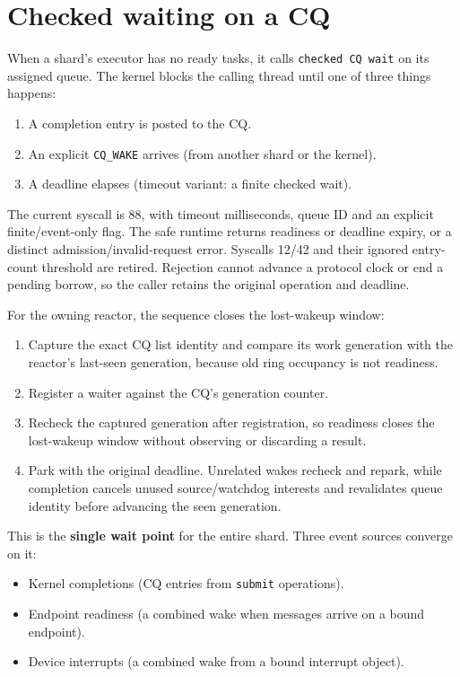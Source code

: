 \section{Checked waiting on a CQ}

When a shard's executor has no ready tasks, it calls \texttt{checked CQ wait} on its
assigned queue. The kernel blocks the calling thread until one of three things
happens:

\begin{enumerate}
    \item A completion entry is posted to the CQ.
    \item An explicit \texttt{CQ\_WAKE} arrives (from another shard or the
        kernel).
    \item A deadline elapses (timeout variant: a finite checked wait).
\end{enumerate}

The current syscall is 88, with timeout milliseconds, queue ID and an explicit
finite/event-only flag. The safe runtime returns readiness or deadline expiry,
or a distinct admission/invalid-request error. Syscalls 12/42 and their ignored
entry-count threshold are retired. Rejection cannot advance a protocol clock or
end a pending borrow, so the caller retains the original operation and deadline.

For the owning reactor, the sequence closes the lost-wakeup window:

\begin{enumerate}
    \item Capture the exact CQ list identity and compare its work generation
        with the reactor's last-seen generation, because old ring occupancy is not readiness.
    \item Register a waiter against the CQ's generation counter.
    \item Recheck the captured generation after registration, so readiness closes
        the lost-wakeup window without observing or discarding a result.
    \item Park with the original deadline. Unrelated wakes recheck and repark, while
        completion cancels unused source/watchdog interests and revalidates queue
        identity before advancing the seen generation.
\end{enumerate}

This is the \textbf{single wait point} for the entire shard. Three event sources
converge on it:

\begin{itemize}
    \item Kernel completions (CQ entries from \texttt{submit} operations).
    \item Endpoint readiness (a combined wake when messages arrive on a bound
        endpoint).
    \item Device interrupts (a combined wake from a bound interrupt object).
\end{itemize}

